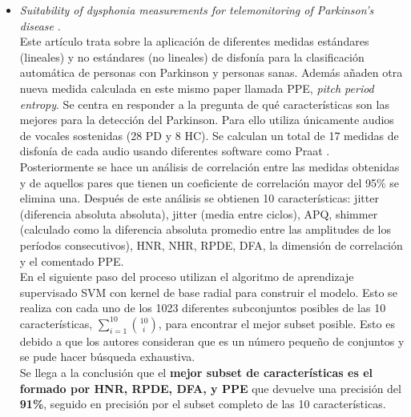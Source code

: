 \begin{itemize}
	\item \textit{Suitability of dysphonia measurements for telemonitoring of Parkinson’s disease} \cite{MxLtSuitability}.\\
	Este artículo trata sobre la aplicación de diferentes medidas estándares (lineales) y no estándares (no lineales) de disfonía para la clasificación automática de personas con Parkinson y personas sanas. Además añaden otra nueva medida calculada en este mismo paper llamada PPE, \textit{pitch period entropy}. Se centra en responder a la pregunta de qué características son las mejores para la detección del Parkinson. Para ello utiliza únicamente audios de vocales sostenidas (28 PD y 8 HC). Se calculan un total de 17 medidas de disfonía de cada audio usando diferentes software como Praat \cite{praat}. Posteriormente se hace un análisis de correlación entre las medidas obtenidas y de aquellos pares que tienen un coeficiente de correlación mayor del 95\% se elimina una. Después de este análisis se obtienen 10 características: jitter (diferencia absoluta absoluta), jitter (media entre ciclos), APQ, shimmer (calculado como la diferencia absoluta promedio entre las amplitudes de los períodos consecutivos), HNR, NHR, RPDE, DFA, la dimensión de correlación y el comentado PPE.\\ En el siguiente paso del proceso utilizan el algoritmo de aprendizaje supervisado SVM con kernel de base radial para construir el modelo. Esto se realiza con cada uno de los 1023 diferentes subconjuntos posibles de las 10 características, $\sum_{i=1}^{10} \binom{10}{i}$, para encontrar el mejor subset posible. Esto es debido a que los autores consideran que es un número pequeño de conjuntos y se pude hacer búsqueda exhaustiva. \\ Se llega a la conclusión que el \textbf{mejor subset de características es el formado por HNR, RPDE, DFA, y PPE} que devuelve una precisión del \textbf{91\%}, seguido en precisión por el subset completo de las 10 características.
	

\end{itemize}
